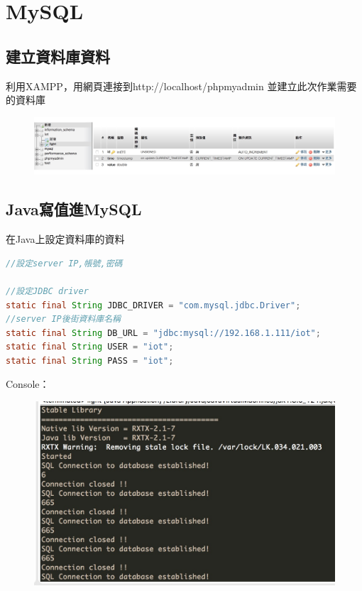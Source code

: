 \documentclass[12pt,a4paper]{article}
\begin{document}
\newpage
\section{MySQL}
{
\subsection{建立資料庫資料}
利用XAMPP，用網頁連接到http://localhost/phpmyadmin
並建立此次作業需要的資料庫

\begin{figure}[ht]
\centering
\includegraphics[width=1.0\textwidth]{image/table.jpg}
\end{figure}

\subsection{Java寫值進MySQL}
在Java上設定資料庫的資料
\begin{shaded}
\begin{lstlisting}[language=Java]
//設定server IP,帳號,密碼

//設定JDBC driver  
static final String JDBC_DRIVER = "com.mysql.jdbc.Driver";
//server IP後街資料庫名稱
static final String DB_URL = "jdbc:mysql://192.168.1.111/iot";
static final String USER = "iot";
static final String PASS = "iot";
\end{lstlisting}
\end{shaded}

\newpage
Console：
\begin{figure}[ht]
\centering
\includegraphics[width=1.0\textwidth]{image/datatomysql.jpg}
\end{figure}

}
\end{document}
